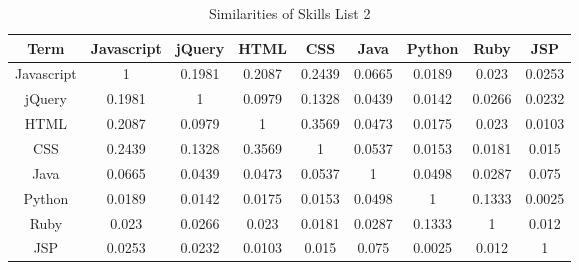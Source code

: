 \begin{table}

\caption{Similarities of Skills List 2}
\begin{tabular}{ c | c c c c c c c c }
 \hline
  Term       & Javascript & jQuery &  HTML  &  CSS   &  Java  & Python &  Ruby  &  JSP    \\  \hline
  Javascript &     1      & 0.1981 & 0.2087 & 0.2439 & 0.0665 & 0.0189 & 0.023  & 0.0253   \\
    jQuery   &   0.1981   &   1    & 0.0979 & 0.1328 & 0.0439 & 0.0142 & 0.0266 & 0.0232    \\
     HTML    &   0.2087   & 0.0979 &   1    & 0.3569 & 0.0473 & 0.0175 & 0.023  & 0.0103   \\
     CSS     &   0.2439   & 0.1328 & 0.3569 &   1    & 0.0537 & 0.0153 & 0.0181 & 0.015    \\
     Java    &   0.0665   & 0.0439 & 0.0473 & 0.0537 &   1    & 0.0498 & 0.0287 & 0.075    \\
    Python   &   0.0189   & 0.0142 & 0.0175 & 0.0153 & 0.0498 &   1    & 0.1333 & 0.0025   \\
     Ruby    &   0.023    & 0.0266 & 0.023  & 0.0181 & 0.0287 & 0.1333 &   1    & 0.012    \\
     JSP     &   0.0253   & 0.0232 & 0.0103 & 0.015  & 0.075  & 0.0025 & 0.012  &   1      \\
 \hline
\end{tabular}
\label{tab:dismatrix2}
\end{table}

